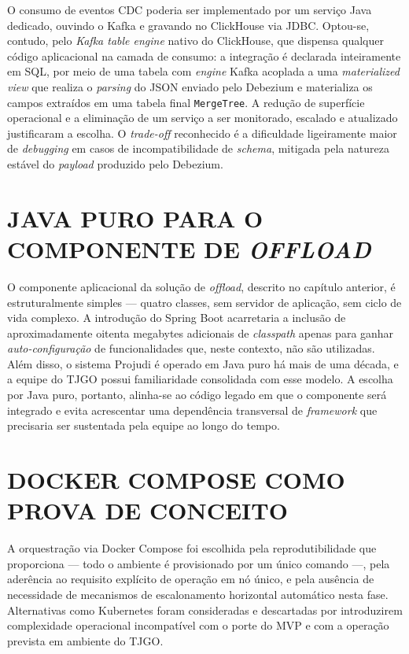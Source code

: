 \documentclass[12pt,letterpaper,oneside]{report}
\begin{document}
O consumo de eventos CDC poderia ser implementado por um serviço Java dedicado, ouvindo o Kafka e gravando no ClickHouse via JDBC. Optou-se, contudo, pelo \textit{Kafka table engine} nativo do ClickHouse, que dispensa qualquer código aplicacional na camada de consumo: a integração é declarada inteiramente em SQL, por meio de uma tabela com \textit{engine} Kafka acoplada a uma \textit{materialized view} que realiza o \textit{parsing} do JSON enviado pelo Debezium e materializa os campos extraídos em uma tabela final \texttt{MergeTree}. A redução de superfície operacional e a eliminação de um serviço a ser monitorado, escalado e atualizado justificaram a escolha. O \textit{trade-off} reconhecido é a dificuldade ligeiramente maior de \textit{debugging} em casos de incompatibilidade de \textit{schema}, mitigada pela natureza estável do \textit{payload} produzido pelo Debezium.

\section{JAVA PURO PARA O COMPONENTE DE \textit{OFFLOAD}}

O componente aplicacional da solução de \textit{offload}, descrito no capítulo anterior, é estruturalmente simples — quatro classes, sem servidor de aplicação, sem ciclo de vida complexo. A introdução do Spring Boot acarretaria a inclusão de aproximadamente oitenta megabytes adicionais de \textit{classpath} apenas para ganhar \textit{auto-configuração} de funcionalidades que, neste contexto, não são utilizadas. Além disso, o sistema Projudi é operado em Java puro há mais de uma década, e a equipe do TJGO possui familiaridade consolidada com esse modelo. A escolha por Java puro, portanto, alinha-se ao código legado em que o componente será integrado e evita acrescentar uma dependência transversal de \textit{framework} que precisaria ser sustentada pela equipe ao longo do tempo.

\section{DOCKER COMPOSE COMO PROVA DE CONCEITO}

A orquestração via Docker Compose foi escolhida pela reprodutibilidade que proporciona — todo o ambiente é provisionado por um único comando —, pela aderência ao requisito explícito de operação em nó único, e pela ausência de necessidade de mecanismos de escalonamento horizontal automático nesta fase. Alternativas como Kubernetes foram consideradas e descartadas por introduzirem complexidade operacional incompatível com o porte do MVP e com a operação prevista em ambiente do TJGO.
\end{document}

